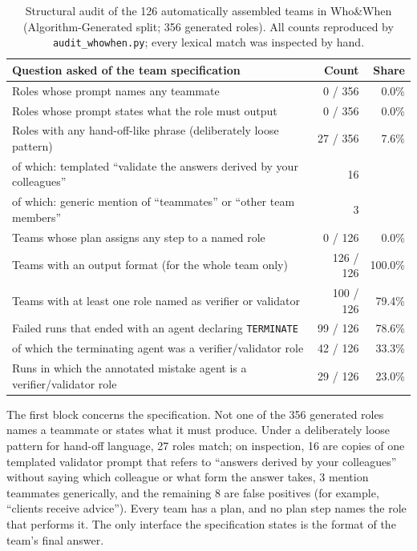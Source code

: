 \documentclass[10pt,a4paper]{article}
\newcommand{\code}[1]{\texttt{#1}}
\newcommand{\file}[1]{\texttt{#1}}
\begin{document}
\begin{table}[!htb]
\centering\small
\caption{Structural audit of the 126 automatically assembled teams in Who\&When
(Algorithm-Generated split; 356 generated roles). All counts reproduced by
\file{audit_whowhen.py}; every lexical match was inspected by hand.}
\label{tab:audit}
\begin{tabularx}{\textwidth}{@{}X r r@{}}
\toprule
Question asked of the team specification & Count & Share \\
\midrule
Roles whose prompt names any teammate & 0 / 356 & 0.0\% \\
Roles whose prompt states what the role must output & 0 / 356 & 0.0\% \\
Roles with any hand-off-like phrase (deliberately loose pattern) & 27 / 356 & 7.6\% \\
\quad of which: templated ``validate the answers derived by your colleagues'' & 16 & \\
\quad of which: generic mention of ``teammates'' or ``other team members'' & 3 & \\
Teams whose plan assigns any step to a named role & 0 / 126 & 0.0\% \\
Teams with an output format (for the whole team only) & 126 / 126 & 100.0\% \\
Teams with at least one role named as verifier or validator & 100 / 126 & 79.4\% \\
\midrule
Failed runs that ended with an agent declaring \code{TERMINATE} & 99 / 126 & 78.6\% \\
\quad of which the terminating agent was a verifier/validator role & 42 / 126 & 33.3\% \\
Runs in which the annotated mistake agent is a verifier/validator role & 29 / 126 & 23.0\% \\
\bottomrule
\end{tabularx}
\end{table}

The first block concerns the specification. Not one of the 356 generated
roles names a teammate or states what it must produce. Under a deliberately
loose pattern for hand-off language, 27 roles match; on inspection, 16 are
copies of one templated validator prompt that refers to ``answers derived
by your colleagues'' without saying which colleague or what form the answer
takes, 3 mention teammates generically, and the remaining 8 are false
positives (for example, ``clients receive advice''). Every team has a plan,
and no plan step names the role that performs it. The only interface the
specification states is the format of the team's final answer.
\end{document}
